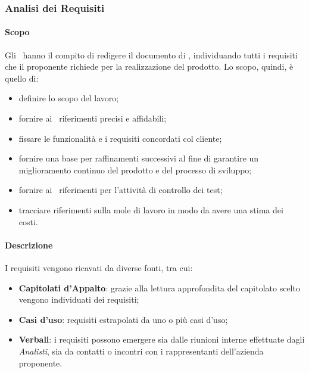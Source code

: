 \subsubsection{Analisi dei Requisiti}

\paragraph{Scopo}

Gli \anas\ hanno il compito di redigere il documento di \AdR, individuando tutti i requisiti che il proponente richiede per la realizzazione del prodotto.  Lo scopo,  quindi,  è quello di:
\begin{itemize}

\item definire lo scopo del lavoro;

\item fornire ai \progs\ riferimenti precisi e affidabili;

\item fissare le funzionalità e i requisiti concordati col cliente;

\item fornire una base per raffinamenti successivi al fine di garantire un miglioramento continuo del prodotto e del processo di sviluppo;

\item fornire ai \vers\ riferimenti per l'attività di controllo dei test;

\item tracciare riferimenti sulla mole di lavoro in modo da avere una stima dei costi.

\end{itemize}

\paragraph{Descrizione}

I requisiti vengono ricavati da diverse fonti,  tra cui:
\begin{itemize}

\item \textbf{Capitolati d'Appalto}: grazie alla lettura approfondita del capitolato scelto vengono individuati dei requisiti;

\item \textbf{Casi d'uso}: requisiti estrapolati da uno o più casi d'uso; 

\item \textbf{Verbali}: i requisiti possono emergere sia dalle riunioni interne effettuate dagli \textit{Analisti},  sia da contatti o incontri con i rappresentanti dell'azienda proponente.

\end{itemize}

